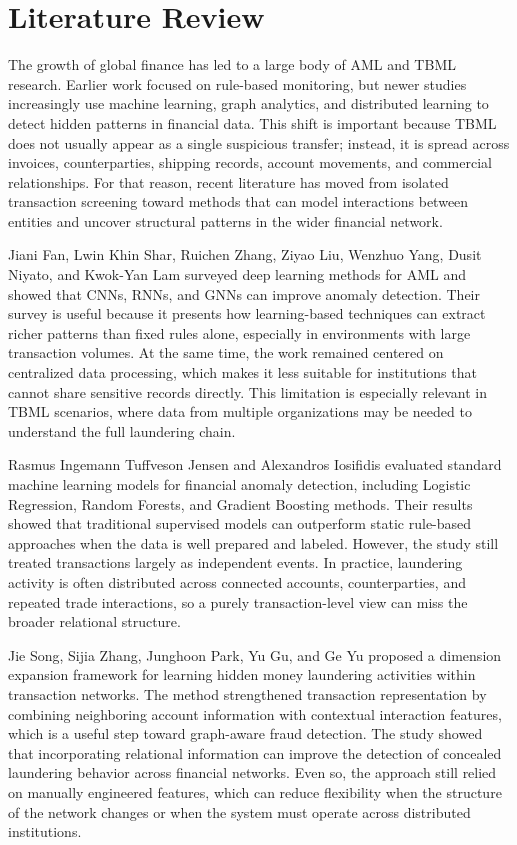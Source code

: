 \section[Literature Review]{\textbf{Literature Review}}

The growth of global finance has led to a large body of AML and TBML research. Earlier work focused on rule-based monitoring, but newer studies increasingly use machine learning, graph analytics, and distributed learning to detect hidden patterns in financial data. This shift is important because TBML does not usually appear as a single suspicious transfer; instead, it is spread across invoices, counterparties, shipping records, account movements, and commercial relationships. For that reason, recent literature has moved from isolated transaction screening toward methods that can model interactions between entities and uncover structural patterns in the wider financial network.

Jiani Fan, Lwin Khin Shar, Ruichen Zhang, Ziyao Liu, Wenzhuo Yang, Dusit Niyato, and Kwok-Yan Lam \cite{Fan2026} surveyed deep learning methods for AML and showed that CNNs, RNNs, and GNNs can improve anomaly detection. Their survey is useful because it presents how learning-based techniques can extract richer patterns than fixed rules alone, especially in environments with large transaction volumes. At the same time, the work remained centered on centralized data processing, which makes it less suitable for institutions that cannot share sensitive records directly. This limitation is especially relevant in TBML scenarios, where data from multiple organizations may be needed to understand the full laundering chain.

Rasmus Ingemann Tuffveson Jensen and Alexandros Iosifidis \cite{Jensen2023} evaluated standard machine learning models for financial anomaly detection, including Logistic Regression, Random Forests, and Gradient Boosting methods. Their results showed that traditional supervised models can outperform static rule-based approaches when the data is well prepared and labeled. However, the study still treated transactions largely as independent events. In practice, laundering activity is often distributed across connected accounts, counterparties, and repeated trade interactions, so a purely transaction-level view can miss the broader relational structure.

Jie Song, Sijia Zhang, Junghoon Park, Yu Gu, and Ge Yu \cite{Song2026} proposed a dimension expansion framework for learning hidden money laundering activities within transaction networks. The method strengthened transaction representation by combining neighboring account information with contextual interaction features, which is a useful step toward graph-aware fraud detection. The study showed that incorporating relational information can improve the detection of concealed laundering behavior across financial networks. Even so, the approach still relied on manually engineered features, which can reduce flexibility when the structure of the network changes or when the system must operate across distributed institutions.

